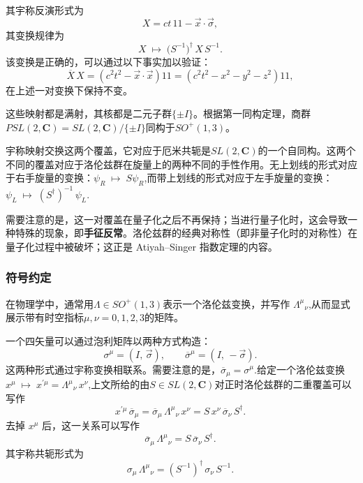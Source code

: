 其宇称反演形式为
\[
X = ct\,1\!\!1 - \vec{x}\cdot\vec{\sigma},~
\]
其变换规律为
\[
X \;\mapsto\; \bigl(S^{-1}\bigr)^{\dagger}\, X \, S^{-1}.~
\]
该变换是正确的，可以通过以下事实加以验证：
\[
\overline{X}\,X = \left(c^{2}t^{2} - \vec{x}\cdot \vec{x}\right)1\!\!1
= \left(c^{2}t^{2} - x^{2} - y^{2} - z^{2}\right)1\!\!1,~
\]
在上述一对变换下保持不变。

这些映射都是满射，其核都是二元子群$\{\pm I\}$。根据第一同构定理，商群$PSL(2,\mathbf{C}) = SL(2,\mathbf{C}) / \{\pm I\}$同构于$SO^{+}(1,3)$。

宇称映射交换这两个覆盖，它对应于厄米共轭是$SL(2,\mathbf{C})$的一个自同构。这两个不同的覆盖对应于洛伦兹群在旋量上的两种不同的手性作用。无上划线的形式对应于右手旋量的变换：$\psi_{R} \;\mapsto\; S \psi_{R}$,而带上划线的形式对应于左手旋量的变换：$\psi_{L} \;\mapsto\; (S^{\dagger})^{-1}\,\psi_{L}$.

需要注意的是，这一对覆盖在量子化之后不再保持；当进行量子化时，这会导致一种特殊的现象，即\textbf{手征反常}。洛伦兹群的经典对称性（即非量子化时的对称性）在量子化过程中被破坏；这正是 Atiyah–Singer 指数定理的内容。
\subsubsection{符号约定}
在物理学中，通常用$\Lambda \in SO^{+}(1,3)$表示一个洛伦兹变换，并写作
${\Lambda^{\mu}}_{\nu}$,从而显式展示带有时空指标$\mu,\nu = 0,1,2,3$的矩阵。

一个四矢量可以通过泡利矩阵以两种方式构造：
\[
\sigma^{\mu} = (I,\, \vec{\sigma}),
\qquad
\overline{\sigma}^{\mu} = (I,\, -\vec{\sigma}).~
\]
这两种形式通过宇称变换相联系。需要注意的是，$\overline{\sigma}_{\mu} = \sigma^{\mu}$.给定一个洛伦兹变换$x^{\mu} \;\mapsto\; x^{\prime \mu} = {\Lambda^{\mu}}_{\nu}\, x^{\nu}$,上文所给的由$S \in SL(2,\mathbf{C})$对正时洛伦兹群的二重覆盖可以写作
\[
x^{\prime \mu}\,\overline{\sigma}_{\mu}
= \overline{\sigma}_{\mu}\,{\Lambda^{\mu}}_{\nu}\,x^{\nu}
= S \, x^{\nu}\,\overline{\sigma}_{\nu}\, S^{\dagger}.~
\]
去掉 $x^{\mu}$ 后，这一关系可以写作
\[
\overline{\sigma}_{\mu}\,{\Lambda^{\mu}}_{\nu}
= S \,\overline{\sigma}_{\nu}\, S^{\dagger}.~
\]
其宇称共轭形式为
\[
\sigma_{\mu}\,{\Lambda^{\mu}}_{\nu}
= \left(S^{-1}\right)^{\dagger}\,\sigma_{\nu}\,S^{-1}.~
\]
